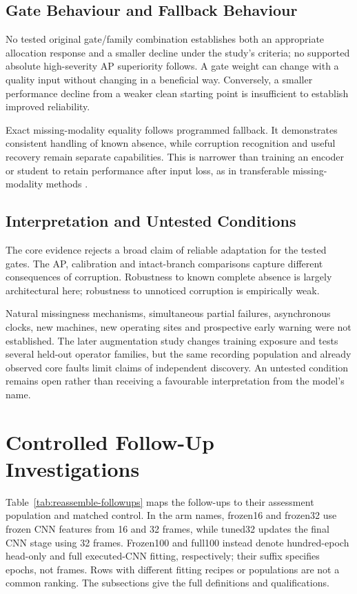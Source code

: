 \subsection{Gate Behaviour and Fallback Behaviour}
No tested original gate/family combination establishes both an appropriate allocation
response and a smaller decline under the study's criteria; no supported absolute
high-severity AP superiority follows. A gate weight can change with a quality input
without changing in a beneficial way. Conversely, a smaller performance decline from a
weaker clean starting point is insufficient to establish improved reliability.

Exact missing-modality equality follows programmed fallback. It demonstrates consistent
handling of known absence, while corruption recognition and useful recovery remain
separate capabilities. This is narrower than training an encoder or student to retain
performance after input loss, as in transferable missing-modality methods
\parencite{P005,P007,P016}.

\subsection{Interpretation and Untested Conditions}
The core evidence rejects a broad claim of reliable adaptation for the tested gates. The
AP, calibration and intact-branch comparisons capture different consequences of
corruption. Robustness to known complete absence is largely architectural here;
robustness to unnoticed corruption is empirically weak.

Natural missingness mechanisms, simultaneous partial failures, asynchronous clocks, new
machines, new operating sites and prospective early warning were not established. The
later augmentation study changes training exposure and tests several held-out operator
families, but the same recording population and already observed core faults limit
claims of independent discovery. An untested condition remains open rather than
receiving a favourable interpretation from the model's name.

\section{Controlled Follow-Up Investigations}
\label{sec:reassemble-followups}
Table~\ref{tab:reassemble-followups} maps the follow-ups to their assessment population
and matched control. In the arm names, frozen16 and frozen32 use frozen CNN features
from 16 and 32 frames, while tuned32 updates the final CNN stage using 32 frames.
Frozen100 and full100 instead denote hundred-epoch head-only and full executed-CNN
fitting, respectively; their suffix specifies epochs, not frames. Rows with different
fitting recipes or populations are not a common ranking. The subsections give the
full definitions and qualifications.

